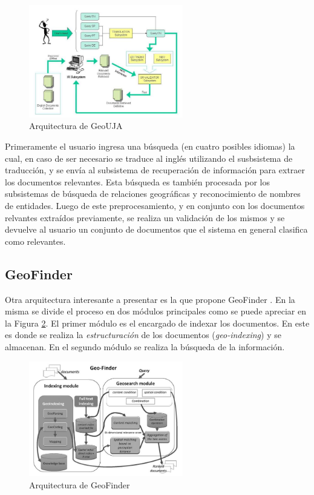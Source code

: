 \documentclass{llncs}
\begin{document}
\begin{figure}[htb]%
	\begin{center}
		\includegraphics[width=0.6\textwidth]{geouja_arch.jpg}
	\end{center}
	\caption{Arquitectura de GeoUJA \cite{perea2007}}
	\label{fig:archgeouja}
\end{figure}

Primeramente el usuario ingresa una búsqueda (en cuatro posibles idiomas) la
cual, en caso de ser necesario se traduce al inglés utilizando el susbsistema
de traducción, y se envía al subsistema de recuperación de información para
extraer los documentos relevantes. Esta búsqueda es también procesada por los
subsistemas de búsqueda de relaciones geográficas y reconocimiento de nombres de
entidades. Luego de este preprocesamiento, y en conjunto con los documentos
relvantes extraídos previamente, se realiza un validación de los mismos y se
devuelve al usuario un conjunto de documentos que el sistema en general
clasifica como relevantes.

\subsection{GeoFinder}\label{sec:archgeofinder}

Otra arquitectura interesante a presentar es la que propone GeoFinder
\cite{bordogna2012}. En la misma se divide el proceso en dos módulos principales
como se puede apreciar en la Figura \ref{fig:archgeofinder}. El primer módulo es
el encargado de indexar los documentos. En este es donde se realiza la
\emph{estructuración} de los documentos (\emph{geo-indexing}) y se almacenan.
En el segundo módulo se realiza la búsqueda de la información.

\begin{figure}[htb]%
	\begin{center}
		\includegraphics[width=0.6\textwidth]{geofinder_arch.jpg}
	\end{center}
	\caption{Arquitectura de GeoFinder \cite{bordogna2012}}
	\label{fig:archgeofinder}
\end{figure}
\end{document}
